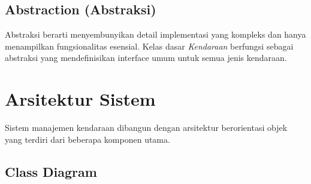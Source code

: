 \documentclass[12pt]{article}
\begin{document}
\subsection{Abstraction (Abstraksi)}
Abstraksi berarti menyembunyikan detail implementasi yang kompleks dan hanya menampilkan fungsionalitas esensial. Kelas dasar \textit{Kendaraan} berfungsi sebagai abstraksi yang mendefinisikan interface umum untuk semua jenis kendaraan.

\section{Arsitektur Sistem}
Sistem manajemen kendaraan dibangun dengan arsitektur berorientasi objek yang terdiri dari beberapa komponen utama.

\subsection{Class Diagram}
\end{document}
